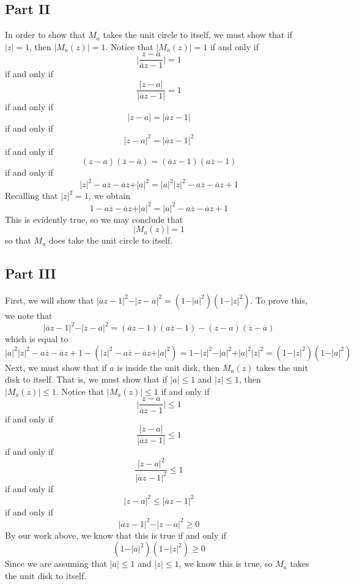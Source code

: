 \documentclass[12pt]{article}
\begin{document}
\subsection*{Part II}
In order to show that $M_a$ takes the unit circle to itself, we must show that if $\vert z \vert = 1$, then $\vert M_a(z) \vert = 1$. Notice that $\vert M_a(z) \vert = 1$ if and only if
\[
\bigg \vert \frac{z-a}{\overline{a}z - 1} \bigg \vert = 1
\] if and only if
\[
\frac{\vert z- a \vert}{\vert \overline{a}z - 1 \vert} = 1
\] if and only if 
\[
\vert z-a \vert = \vert \overline{a}z - 1 \vert
\] if and only if
\[
\vert z-a \vert^2 = \vert \overline{a}z - 1 \vert^2
\] if and only if
\[
(z-a)(\overline{z} - \overline{a}) = (\overline{a}z-1)(a\overline{z}-1)
\] if and only if
\[
\vert z \vert^2 - a\overline{z} - \overline{a}z + \vert a \vert^2 = \vert a \vert ^2 \vert z \vert^2  - a \overline{z} - \overline{a}z + 1
\] Recalling that $\vert z \vert^2 = 1$, we obtain
\[
1 - a\overline{z} - \overline{a}z + \vert a \vert^2 = \vert a \vert ^2  - a \overline{z} - \overline{a}z + 1
\] This is evidently true, so we may conclude that
\[
\vert M_a(z)\vert = 1
\] so that $M_a$ does take the unit circle to itself.
\subsection*{Part III}
First, we will show that $\vert \overline{a}z - 1\vert^2 - \vert z - a \vert^2 = (1-\vert a \vert^2)(1 - \vert z \vert^2)$. To prove this, we note that
\[
\vert \overline{a}z - 1\vert^2 - \vert z - a \vert^2 = (\overline{a}z - 1)(a\overline{z} - 1) - (z-a)(\overline{z} - \overline{a})
\] which is equal to
\[
\vert a \vert^2 \vert z \vert ^2 - a \overline{z} - \overline{a}z + 1 - (\vert z \vert^2 - a\overline{z} - \overline{a}z + \vert a \vert^2) = 1 - \vert z \vert^2 - \vert a \vert^2 + \vert a\vert^2 \vert z \vert^2 = (1-\vert z \vert^2)(1-\vert a \vert^2)
\] Next, we must show that if $a$ is inside the unit disk, then $M_a(z)$ takes the unit disk to itself. That is, we must show that if $\vert a \vert \leq 1$ and $\vert z \vert \leq 1$, then $\vert M_a(z) \vert \leq 1$. Notice that $\vert M_a(z) \vert \leq 1$ if and only if
\[
\bigg \vert \frac{z-a}{\overline{a}z - 1} \bigg \vert \leq 1
\] if and only if 
\[
\frac{\vert z- a \vert}{\vert \overline{a}z - 1 \vert} \leq 1
\] if and only if
\[
\frac{\vert z- a \vert^2}{\vert \overline{a}z - 1 \vert^2} \leq 1
\] if and only if
\[
\vert z - a\vert^2 \leq \vert \overline{a}z - 1 \vert^2
\] if and only if
\[
\vert \overline{a}z - 1 \vert^2 - \vert z - a\vert^2 \geq 0 
\] By our work above, we know that this is true if and only if
\[
(1-\vert a \vert^2)(1 - \vert z \vert^2) \geq 0
\] Since we are assuming that $\vert a \vert \leq 1$ and $\vert z \vert \leq 1$, we know this is true, so $M_a$ takes the unit disk to itself.
\newpage
\end{document}
